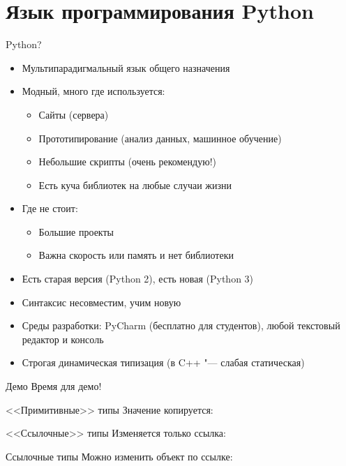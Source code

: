 \section{Язык программирования Python}

\begin{frame}[t]{Python?}
	\begin{itemize}
		\item Мультипарадигмальный язык общего назначения
		\item Модный, много где используется:
			\begin{itemize}
				\item Сайты (сервера)
				\item Прототипирование (анализ данных, машинное обучение)
				\item Небольшие скрипты (очень рекомендую!)
				\item Есть куча библиотек на любые случаи жизни
			\end{itemize}
		\item Где не стоит:
			\begin{itemize}
				\item Большие проекты
				\item Важна скорость или память и нет библиотеки
			\end{itemize}
		\item Есть старая версия (Python 2), есть новая (Python 3)
		\item Синтаксис несовместим, учим новую
		\item Среды разработки: PyCharm (бесплатно для студентов), любой текстовый редактор и консоль
		\item Строгая динамическая типизация (в C++ "--- слабая статическая)
	\end{itemize}
\end{frame}

\begin{frame}[t]{Демо}
	Время для демо!
\end{frame}

\begin{frame}[t]{<<Примитивные>> типы}
	Значение копируется:
\end{frame}

\begin{frame}[t]{<<Ссылочные>> типы}
	Изменяется только ссылка:
\end{frame}

\begin{frame}[t]{Ссылочные типы}
	Можно изменить объект по ссылке:
\end{frame}

